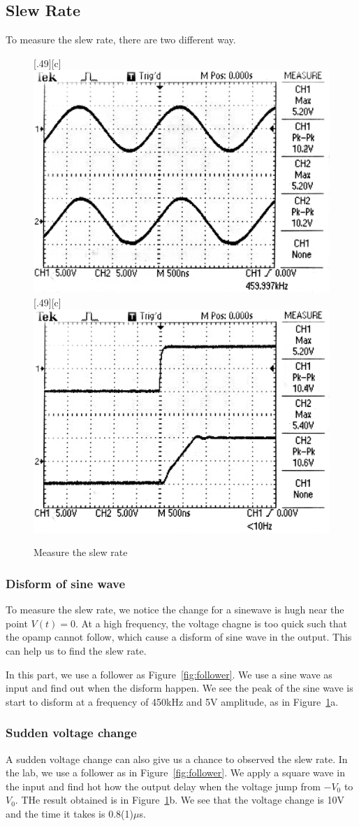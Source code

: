 \documentclass[aps,prl,reprint]{revtex4-1}
\begin{document}
    \subsection{Slew Rate}
        To measure the slew rate, there are two different way.
        \begin{figure}[h]
            \centering
            [.49\linewidth][c]{%
                \includegraphics[width=.49\linewidth]{image/rate/wave.pdf}}
            [.49\linewidth][c]{%
                \includegraphics[width=.49\linewidth]{image/rate/slope.pdf}}
            \caption{Measure the slew rate}
            \label{fig:slewRate}
        \end{figure}
        \subsubsection{Disform of sine wave}
            To measure the slew rate, we notice the change for a sinewave is hugh near the point $V(t) = 0$. At a high frequency, the voltage chagne is too quick such that the opamp cannot follow, which cause a disform of sine wave in the output. This can help us to find the slew rate.

            In this part, we use a follower as Figure~\ref{fig:follower}. We use a sine wave as input and find out when the disform happen. We see the peak of the sine wave is start to disform at a frequency of 450kHz and 5V amplitude, as in Figure~\ref{fig:slewRate}a.
        \subsubsection{Sudden voltage change}
            A sudden voltage change can also give us a chance to observed the slew rate. In the lab, we use a follower as in Figure~\ref{fig:follower}. We apply a square wave in the input and find hot how the output delay when the voltage jump from $-V_0$ to $V_0$. THe result obtained is in Figure~\ref{fig:slewRate}b. We see that the voltage change is 10V and the time it takes is 0.8(1)$\mu$s.
\end{document}
